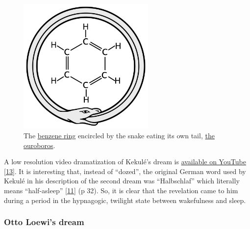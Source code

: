 \documentclass[
  12pt,
  british,
  a4paper,
  rgb,
  dvipsnames,
  svgnames,
  hyphens]{article}
\begin{document}
\begin{figure}
\hypertarget{fig:benzene}{%
\centering
\includegraphics[width=0.6\textwidth,height=\textheight]{images/ouroboros-benzene.svg}
\caption[The
\href{https://en.wikipedia.org/wiki/Benzene\#Structure}{benzene ring}
encircled by the snake eating its own tail,
\href{https://en.wikipedia.org/wiki/Ouroboros}{the ouroboros}.]{The
\href{https://en.wikipedia.org/wiki/Benzene\#Structure}{benzene ring}
encircled by the snake eating its own tail,
\href{https://en.wikipedia.org/wiki/Ouroboros}{the
ouroboros}.\footnotemark{}}\label{fig:benzene}
}
\end{figure}

A low resolution video dramatization of Kekulé's dream is
\href{https://www.youtube.com/watch?v=2NRwd-JJFm4}{available on YouTube}
\protect\hyperlink{ref-kekules-dream}{{[}13{]}}. It is interesting that,
instead of ``dozed'', the original German word used by Kekulé in his
description of the second dream was ``Halbschlaf'' which literally means
``half-asleep'' \protect\hyperlink{ref-weisberg86}{{[}11{]}} (p 32). So,
it is clear that the revelation came to him during a period in the
hypnagogic, twilight state between wakefulness and sleep.

\hypertarget{otto-loewis-dream}{%
\subsubsection{Otto Loewi's dream}\label{otto-loewis-dream}}
\end{document}
